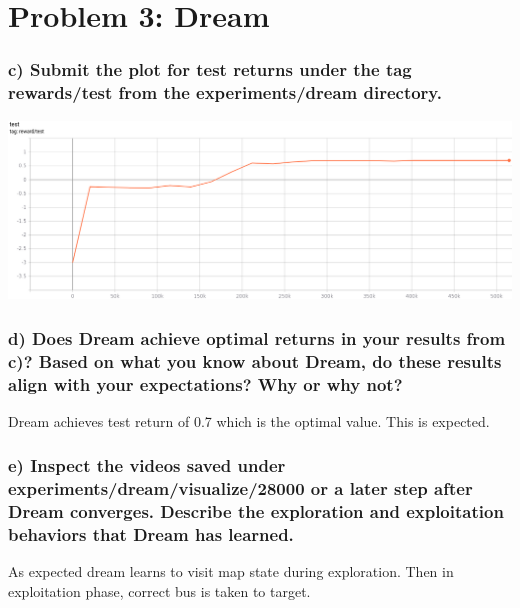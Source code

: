 \documentclass[12pt]{article}
\begin{document}
\section*{Problem 3: Dream}

\subsubsection*{c) Submit the plot for test returns under the tag rewards/test from the experiments/dream directory.}

\includegraphics{figures/dream-test-return}

\subsubsection*{d) Does Dream achieve optimal returns in your results from c)? Based on what you know about Dream, do these results align with your expectations? Why or why not?}
Dream achieves test return of 0.7 which is the optimal value. This is expected.

\subsubsection*{e) Inspect the videos saved under experiments/dream/visualize/28000 or a later step after Dream converges. Describe the exploration and exploitation behaviors that Dream has learned.}
As expected dream learns to visit map state during exploration. Then in exploitation phase, correct bus is taken to target.
\end{document}
